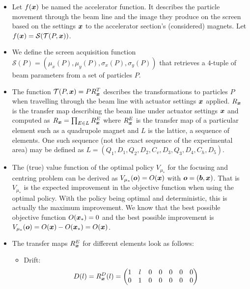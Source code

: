 \begin{itemize}
    \item Let $f(\bm{x})$ be named the accelerator function. It describes the particle movement through the beam line and the image they produce on the screen based on the settings $\bm{x}$ to the accelerator section's (considered) magnets. Let $f(\bm{x}) = \mathcal{S}(\mathcal{T}(P, \bm{x}))$.
    \item We define the screen acquisition function $\mathcal{S}(P) = (\mu_x(P), \mu_y(P), \sigma_x(P), \sigma_y(P))$ that retrieves a $4$-tuple of beam parameters from a set of particles $P$.
    \item The function $\mathcal{T}(P, \bm{x}) = PR_{\bm{x}}^T$ describes the transformations to particles $P$ when travelling through the beam line with actuator settings $\bm{x}$ applied. $R_{\bm{x}}$ is the transfer map describing the beam line under actuator settings $\bm{x}$ and computed as $R_{\bm{x}} = \prod_{E \in L} R_{\bm{x}}^{E}$ where $R_{\bm{x}}^{E}$ is the transfer map of a particular element such as a quadrupole magnet and $L$ is the lattice, a sequence of elements. One such sequence (not the exact sequence of the experimental area) may be defined as $L = (Q_1, D_1, Q_2, D_2, C_v, D_3, Q_3, D_4, C_h, D_5)$.
    \item The (true) value function of the optimal policy $V_{\mu_*}$ for the focusing and centring problem can be derived as $V_{\mu_*}(\bm{o}) = O(\bm{x})$ with $\bm{o} = (\bm{b}, \bm{x})$. That is $V_{\mu_*}$ is the expected improvement in the objective function when using the optimal policy. With the policy being optimal and deterministic, this is actually the maximum improvement. We know that the best possible objective function $O(\bm{x}_*) = 0$ and the best possible improvement is $V_{\mu_*}(\bm{o}) = O(\bm{x}) - O(\bm{x}_*) = O(\bm{x})$.
    \item The transfer maps $R_{\bm{x}}^{E}$ for different elements look as follows:
    \begin{itemize}
        \item Drift:
            \begin{equation*}
                D(l) = R_{\actuators}^D(l) = \begin{pmatrix}
                                             1 & l & 0 & 0 & 0 & 0 & 0 \\ %
                                             0 & 1 & 0 & 0 & 0 & 0 & 0 \\ %

\end{pmatrix}
\end{equation*}
\end{itemize}
\end{itemize}
